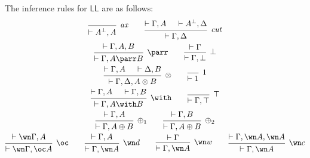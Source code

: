 \documentclass[11pt]{article}
\newcommand\LL{\textsf{LL}}
\newcommand\0{\textbf{0}}
\newcommand\1{\textbf{1}}
\begin{document}
The inference rules for $\LL$ are as follows:
\begin{gather*}
    \begin{prooftree}
        \infer0[\textit{ax}]{\vdash A^\perp, A}
    \end{prooftree}
    \qquad
    \begin{prooftree}
        \hypo{\vdash \Gamma, A}
        \hypo{\vdash A^\perp, \Delta}
        \infer2[\textit{cut}]{\vdash \Gamma, \Delta}
    \end{prooftree}
    \\
    \begin{prooftree}
        \hypo{\vdash \Gamma, A, B}
        \infer1[$\parr$]{\vdash \Gamma, A \parr B}
    \end{prooftree}
    \qquad
    \begin{prooftree}
        \hypo{\vdash \Gamma}
        \infer1[$\bot$]{\vdash \Gamma, \bot}
    \end{prooftree}
    \\
    \begin{prooftree}
        \hypo{\vdash \Gamma, A}
        \hypo{\vdash \Delta, B}
        \infer2[$\otimes$]{\vdash \Gamma, \Delta, A \otimes B}
    \end{prooftree}
    \qquad
    \begin{prooftree}
        \infer0[$1$]{\vdash 1}
    \end{prooftree}
    \\
    \begin{prooftree}
        \hypo{\vdash \Gamma, A}
        \hypo{\vdash \Gamma, B}
        \infer2[$\with$]{\vdash \Gamma, A \with B}
    \end{prooftree}
    \qquad
    \begin{prooftree}
        \infer0[$\top$]{\vdash \Gamma, \top}
    \end{prooftree}
    \\
    \begin{prooftree}
        \hypo{\vdash \Gamma, A}
        \infer1[$\oplus_1$]{\vdash \Gamma, A \oplus B}
    \end{prooftree}
    \qquad
    \begin{prooftree}
        \hypo{\vdash \Gamma, B}
        \infer1[$\oplus_2$]{\vdash \Gamma, A \oplus B}
    \end{prooftree}
    \\
    \begin{prooftree}
        \hypo{\vdash \wn\Gamma, A}
        \infer1[$\oc$]{\vdash \wn\Gamma, \oc A}
    \end{prooftree}
    \qquad
    \begin{prooftree}
        \hypo{\vdash \Gamma, A}
        \infer1[$\wn d$]{\vdash \Gamma, \wn A}
    \end{prooftree}
    \qquad
    \begin{prooftree}
        \hypo{\vdash \Gamma}
        \infer1[$\wn w$]{\vdash \Gamma, \wn A}
    \end{prooftree}
    \qquad
    \begin{prooftree}
        \hypo{\vdash \Gamma, \wn A, \wn A}
        \infer1[$\wn c$]{\vdash \Gamma, \wn A}
    \end{prooftree}
\end{gather*}
\end{document}
